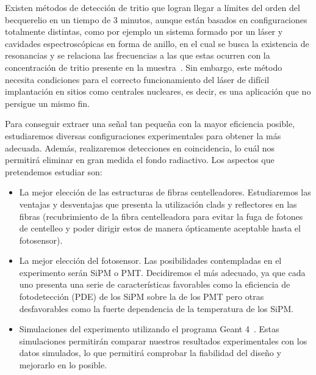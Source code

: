 Existen métodos de detección de tritio que logran llegar a límites del orden del becquerelio en un tiempo de 3 minutos, aunque  están basados en configuraciones totalmente distintas, como por ejemplo un sistema formado por un láser y cavidades espectroscópicas en forma de anillo, en el cual se  busca la existencia de resonancias y  se relaciona las frecuencias a las que estas ocurren con la concentración de tritio presente en la muestra~\cite{Anillo}. Sin embargo, este método necesita  condiciones  para el correcto funcionamiento del láser de difícil implantación  en sitios como centrales nucleares, es decir, es una aplicación que no persigue un mismo fin. 

Para conseguir extraer una señal tan pequeña con la mayor eficiencia posible,  estudiaremos diversas configuraciones experimentales para obtener la más adecuada. Además, realizaremos detecciones en coincidencia, lo cuál nos permitirá eliminar en gran medida el fondo radiactivo. Los aspectos que pretendemos estudiar son: 
\begin{itemize}
\item {}
La mejor elección de las estructuras de fibras centelleadores. Estudiaremos las ventajas y desventajas que presenta la utilización clads  y reflectores en las fibras (recubrimiento de la fibra centelleadora para evitar la fuga de fotones de centelleo y poder dirigir estos de manera ópticamente aceptable hasta el fotosensor). 
\item {}
La mejor elección del fotosensor. Las posibilidades contempladas en el experimento serán SiPM o PMT. Decidiremos el más adecuado, ya que cada uno presenta una serie de características favorables como la eficiencia de fotodetección (PDE) de los SiPM sobre la de los PMT pero otras desfavorables como la  fuerte dependencia de  la temperatura de  los SiPM.

\item {} Simulaciones del experimento  utilizando el programa Geant 4~\cite{geant4a, geant4b, geant4c}. Estas simulaciones permitirán comparar nuestros resultados experimentales con los datos simulados, lo que permitirá comprobar la fiabilidad del diseño y mejorarlo en lo posible. 

\end{itemize}


